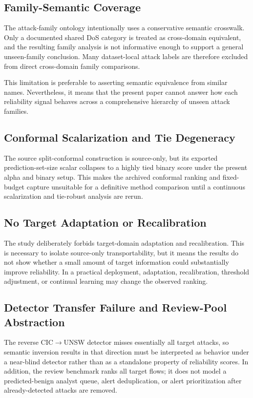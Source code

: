 \documentclass[conference]{IEEEtran}
\begin{document}
\subsection{Family-Semantic Coverage}

The attack-family ontology intentionally uses a conservative semantic crosswalk. Only a documented shared DoS category is treated as cross-domain equivalent, and the resulting family analysis is not informative enough to support a general unseen-family conclusion. Many dataset-local attack labels are therefore excluded from direct cross-domain family comparisons.

This limitation is preferable to asserting semantic equivalence from similar names. Nevertheless, it means that the present paper cannot answer how each reliability signal behaves across a comprehensive hierarchy of unseen attack families.

\subsection{Conformal Scalarization and Tie Degeneracy}

The source split-conformal construction is source-only, but its exported prediction-set-size scalar collapses to a highly tied binary score under the present alpha and binary setup. This makes the archived conformal ranking and fixed-budget capture unsuitable for a definitive method comparison until a continuous scalarization and tie-robust analysis are rerun.

\subsection{No Target Adaptation or Recalibration}

The study deliberately forbids target-domain adaptation and recalibration. This is necessary to isolate source-only transportability, but it means the results do not show whether a small amount of target information could substantially improve reliability. In a practical deployment, adaptation, recalibration, threshold adjustment, or continual learning may change the observed ranking.

\subsection{Detector Transfer Failure and Review-Pool Abstraction}

The reverse CIC$\rightarrow$UNSW detector misses essentially all target attacks, so semantic inversion results in that direction must be interpreted as behavior under a near-blind detector rather than as a standalone property of reliability scores. In addition, the review benchmark ranks all target flows; it does not model a predicted-benign analyst queue, alert deduplication, or alert prioritization after already-detected attacks are removed.
\end{document}
